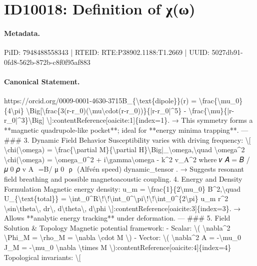 \section*{ID10018: Definition of χ(ω)}
\paragraph{Metadata.}
PiID: 7948488558343 | RTEID: RTE:P38902.1188:T1.2669 | UUID: 5027db91-0fd8-562b-872b-c8f0f95af883

\paragraph{Canonical Statement.}
https://orcid.org/0009-0001-4630-3715B\_\{\textbackslash{}text\{dipole\}\}(r) = \textbackslash{}frac\{\textbackslash{}mu\_0\}\{4\textbackslash{}pi\} \textbackslash{}Big[\textbackslash{}frac\{3(r-r\_0)(\textbackslash{}mu\textbackslash{}cdot(r-r\_0))\}\{|r-r\_0|\textasciicircum{}5\} - \textbackslash{}frac\{\textbackslash{}mu\}\{|r-r\_0|\textasciicircum{}3\}\textbackslash{}Big] \textbackslash{}]:contentReference[oaicite:1]\{index=1\}. → This symmetry forms a **magnetic quadrupole-like pocket**; ideal for **energy minima trapping**. --- \#\#\# 3. Dynamic Field Behavior Susceptibility varies with driving frequency: \textbackslash{}[ \textbackslash{}chi(\textbackslash{}omega) = \textbackslash{}frac\{\textbackslash{}partial M\}\{\textbackslash{}partial H\}\textbackslash{}Big|\_\textbackslash{}omega,\textbackslash{}quad \textbackslash{}omega\textasciicircum{}2 \textbackslash{}chi(\textbackslash{}omega) = \textbackslash{}omega\_0\textasciicircum{}2 + i\textbackslash{}gamma\textbackslash{}omega - k\textasciicircum{}2 v\_A\textasciicircum{}2 where 𝑣 𝐴 = 𝐵 / 𝜇 0 𝜌 v A ​ =B/ μ 0 ​ ρ ​ (Alfvén speed) dynamic\_tensor . → Suggests resonant field breathing and possible magnetoacoustic coupling. 4. Energy and Density Formulation Magnetic energy density: u\_m = \textbackslash{}frac\{1\}\{2\textbackslash{}mu\_0\} B\textasciicircum{}2,\textbackslash{}quad U\_\{\textbackslash{}text\{total\}\} = \textbackslash{}int\_0\textasciicircum{}R\textbackslash{}!\textbackslash{}!\textbackslash{}int\_0\textasciicircum{}\textbackslash{}pi\textbackslash{}!\textbackslash{}!\textbackslash{}int\_0\textasciicircum{}\{2\textbackslash{}pi\} u\_m r\textasciicircum{}2 \textbackslash{}sin\textbackslash{}theta\textbackslash{}, dr\textbackslash{}, d\textbackslash{}theta\textbackslash{}, d\textbackslash{}phi \textbackslash{}]:contentReference[oaicite:3]\{index=3\}. → Allows **analytic energy tracking** under deformation. --- \#\#\# 5. Field Solution \& Topology Magnetic potential framework: - Scalar: \textbackslash{}( \textbackslash{}nabla\textasciicircum{}2 \textbackslash{}Phi\_M = \textbackslash{}rho\_M = \textbackslash{}nabla \textbackslash{}cdot M \textbackslash{}) - Vector: \textbackslash{}( \textbackslash{}nabla\textasciicircum{}2 A = -\textbackslash{}mu\_0 J\_M = -\textbackslash{}mu\_0 \textbackslash{}nabla \textbackslash{}times M \textbackslash{}):contentReference[oaicite:4]\{index=4\} Topological invariants: \textbackslash{}[

